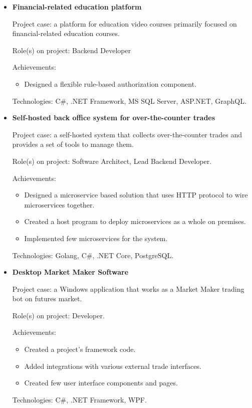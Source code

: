 \documentclass{article}
\begin{document}
\begin{itemize}
{        Technologies: C\#, .NET Framework/.NET 6, WPF, SQLite.
    }
    \item {
        \textbf{Financial-related education platform}
        
        Project case: a platform for education video courses primarily focused on financial-related education courses.
        
        Role(s) on project: Backend Developer
        
        Achievements:
        
            \begin{itemize}
                \item Designed a flexible rule-based authorization component.
            \end{itemize}
        
        Technologies: C\#, .NET Framework, MS SQL Server, ASP.NET, GraphQL.
    }
    \item {
        \textbf{Self-hosted back office system for over-the-counter trades}
        
        Project case: a self-hosted system that collects over-the-counter trades and provides a set of tools to manage them.
        
        Role(s) on project: Software Architect, Lead Backend Developer.
        
        Achievements:
        
            \begin{itemize}
                \item Designed a microservice based solution that uses HTTP protocol to wire microservices together.
                \item Created a host program to deploy microservices as a whole on premises.
                \item Implemented few microservices for the system.
            \end{itemize}
        
        Technologies: Golang, C\#, .NET Core, PostgreSQL.
    }
    \item {
        \textbf{Desktop Market Maker Software}
        
        Project case: a Windows application that works as a Market Maker trading bot on futures market.
        
        Role(s) on project: Developer.
        
        Achievements:
        
            \begin{itemize}
                \item Created a project's framework code.
                \item Added integrations with various external trade interfaces.
                \item Created few user interface components and pages.
            \end{itemize}
        
        Technologies: C\#, .NET Framework, WPF.
    }
\end{itemize}
\end{document}
